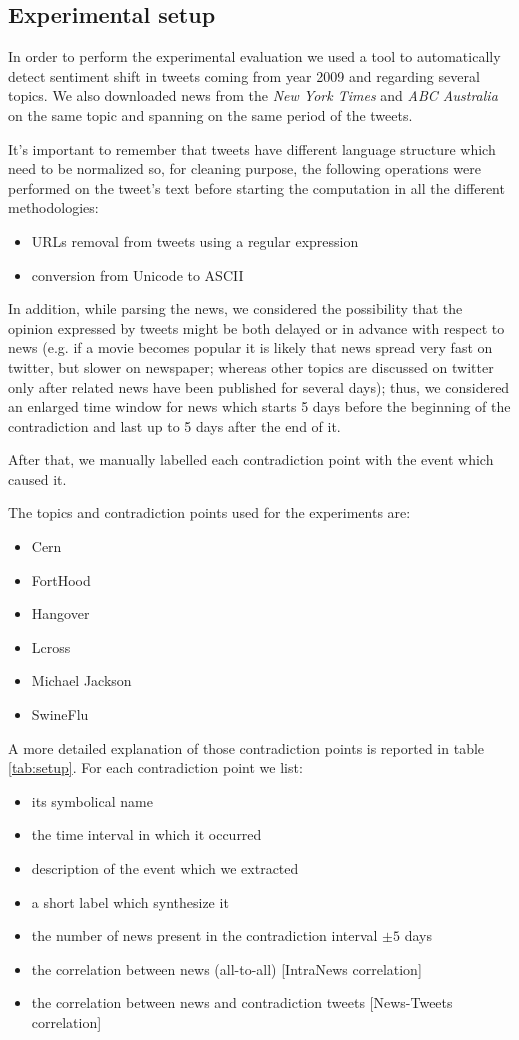 \subsection*{Experimental setup}
In order to perform the experimental evaluation we used a tool to automatically
detect sentiment shift in tweets coming from year 2009 and regarding several
topics. We also downloaded news from the \emph{New York Times} and \emph{ABC Australia} on the same topic and spanning on the same period of the tweets.

It's important to remember that tweets have different language structure which need to be normalized so, for cleaning purpose, the following operations were performed on the tweet's text before starting the computation in all the different methodologies:
\begin{itemize}
	\item URLs removal from tweets using a regular expression
	\item conversion from Unicode to ASCII
\end{itemize}

In addition, while parsing the news, we considered the possibility that the
opinion expressed by tweets might be both delayed or in advance with respect to
news (e.g. if a movie becomes popular it is likely that news spread very fast
on twitter, but slower on newspaper; whereas other topics are discussed on
twitter only after related news have been published for several days); thus, we
considered an enlarged time window for news which starts 5 days before the
beginning of the contradiction and last up to 5 days after the end of it.

After that, we manually labelled each contradiction point with the event which
caused it. 

The topics and contradiction points used for the experiments 
are:
\begin{itemize}
 	\item Cern
 	\item FortHood
 	\item Hangover
 	\item Lcross
 	\item Michael Jackson
 	\item SwineFlu
\end{itemize}

A more detailed explanation of those contradiction points is reported in table \ref{tab:setup}. 
For each contradiction point we list:
\begin{itemize}
	\item its symbolical name
	\item the time interval in which it occurred
	\item description of the event which we extracted 
	\item a short label which synthesize it
	\item the number of news present in the contradiction interval $\pm 5$ days
	\item the correlation between news (all-to-all) [IntraNews correlation]
	\item the correlation between news and contradiction tweets [News-Tweets correlation]
\end{itemize}

